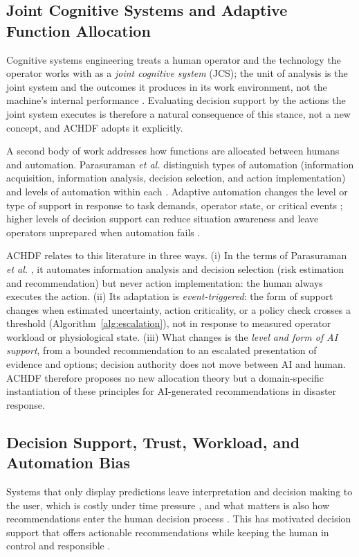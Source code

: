 \documentclass[journal]{IEEEtran}
\theoremstyle{plain}
\theoremstyle{definition}
\begin{document}
\subsection{Joint Cognitive Systems and Adaptive Function Allocation}
Cognitive systems engineering treats a human operator and the technology the operator works with as a \emph{joint cognitive system} (JCS); the unit of analysis is the joint system and the outcomes it produces in its work environment, not the machine's internal performance \cite{Hollnagel2005JCS,Woods2006JCS}. Evaluating decision support by the actions the joint system executes is therefore a natural consequence of this stance, not a new concept, and ACHDF adopts it explicitly.

A second body of work addresses how functions are allocated between humans and automation. Parasuraman \emph{et al.} distinguish types of automation (information acquisition, information analysis, decision selection, and action implementation) and levels of automation within each \cite{Parasuraman2000LOA}. Adaptive automation changes the level or type of support in response to task demands, operator state, or critical events \cite{Scerbo2007,Kaber2004}; higher levels of decision support can reduce situation awareness and leave operators unprepared when automation fails \cite{Kaber2004,Parasuraman2010}.

ACHDF relates to this literature in three ways. (i) In the terms of Parasuraman \emph{et al.} \cite{Parasuraman2000LOA}, it automates information analysis and decision selection (risk estimation and recommendation) but never action implementation: the human always executes the action. (ii) Its adaptation is \emph{event-triggered}: the form of support changes when estimated uncertainty, action criticality, or a policy check crosses a threshold (Algorithm~\ref{alg:escalation}), not in response to measured operator workload or physiological state. (iii) What changes is the \emph{level and form of AI support}, from a bounded recommendation to an escalated presentation of evidence and options; decision authority does not move between AI and human. ACHDF therefore proposes no new allocation theory but a domain-specific instantiation of these principles for AI-generated recommendations in disaster response.

\subsection{Decision Support, Trust, Workload, and Automation Bias}
Systems that only display predictions leave interpretation and decision making to the user, which is costly under time pressure \cite{Bach2024Access,PerezCerrolaza2024CSUR}, and what matters is also how recommendations enter the human decision process \cite{Lai2023FAccT,Muller2022CHIWORK,Hodgson2013THMS}. This has motivated decision support that offers actionable recommendations while keeping the human in control and responsible \cite{Assaad2023TAS,Yang2022THMSReview}.
\end{document}
